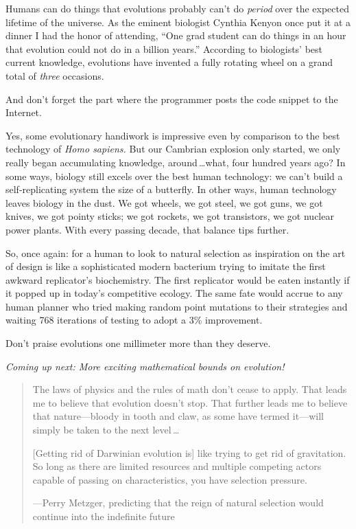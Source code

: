  Humans can do things that evolutions probably
can't do \textit{period} over the expected lifetime of
the universe. As the eminent biologist Cynthia Kenyon once put it at a
dinner I had the honor of attending, ``One grad
student can do things in an hour that evolution could not do in a
billion years.'' According to
biologists' best current knowledge, evolutions have
invented a fully rotating wheel on a grand total of \textit{three}
occasions.


 And don't forget the part where the programmer
posts the code snippet to the Internet.


 Yes, some evolutionary handiwork is impressive even by comparison
to the best technology of \textit{Homo sapiens.} But our Cambrian
explosion only started, we only really began accumulating knowledge,
around\,\ldots what, four hundred years ago? In some ways, biology still
excels over the best human technology: we can't build a
self-replicating system the size of a butterfly. In other ways, human
technology leaves biology in the dust. We got wheels, we got steel, we
got guns, we got knives, we got pointy sticks; we got rockets, we got
transistors, we got nuclear power plants. With every passing decade,
that balance tips further.


 So, once again: for a human to look to natural selection as
inspiration on the art of design is like a sophisticated modern
bacterium trying to imitate the first awkward
replicator's biochemistry. The first replicator would
be eaten instantly if it popped up in today's
competitive ecology. The same fate would accrue to any human planner
who tried making random point mutations to their strategies and waiting
768 iterations of testing to adopt a 3\% improvement.


 Don't praise evolutions one millimeter more than
they deserve.

{
 \textit{Coming up next: More exciting mathematical bounds on
evolution!}}

\myendsectiontext


\bigskip


\begin{quotation}

 The laws of physics and the rules of math don't
cease to apply. That leads me to believe that evolution
doesn't stop. That further leads me to believe that
nature---bloody in tooth and claw, as some have termed it---will simply
be taken to the next level\,\ldots


 [Getting rid of Darwinian evolution is] like trying to get rid of
gravitation. So long as there are limited resources and multiple
competing actors capable of passing on characteristics, you have
selection pressure.

{\raggedleft
 {}---Perry Metzger, predicting that the reign of natural selection
would continue into the indefinite future
\par}
\end{quotation}



